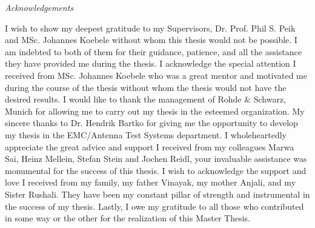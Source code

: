 


\newpage
\thispagestyle{empty}

\begin{center}
\Huge\emph{Acknowledgements}
\end{center}
\medskip

\noindent I wish to show my deepest gratitude to my Supervisors, Dr. Prof. Phil S. Peik and MSc. Johannes Koebele without whom this thesis would not be possible. I am indebted to both of them for their guidance, patience, and all the assistance they have provided me during the thesis. I acknowledge the special attention I received from MSc. Johannes Koebele who was a great mentor and motivated me during the course of the thesis without whom the thesis would not have the desired results. I would like to thank the management of Rohde \& Schwarz, Munich for allowing me to carry out my thesis in the esteemed organization. My sincere thanks to Dr. Hendrik Bartko for giving me the opportunity to develop my thesis in the EMC/Antenna Test Systems department. I wholeheartedly appreciate the great advice and support I received from my colleagues Marwa Sai, Heinz Mellein, Stefan Stein and Jochen Reidl, your invaluable assistance was monumental for the success of this thesis. I wish to acknowledge the support and love I received from my family, my father Vinayak, my mother Anjali, and my Sister Rushali. They have been my constant pillar of strength and instrumental in the success of my thesis. Lastly, I owe my gratitude to all those who contributed in some way or the other for the realization of this Master Thesis.


